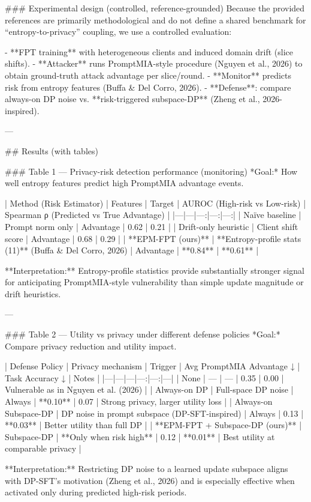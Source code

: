 ### Experimental design (controlled, reference-grounded)  
Because the provided references are primarily methodological and do not define a shared benchmark for “entropy-to-privacy” coupling, we use a controlled evaluation:

- **FPT training** with heterogeneous clients and induced domain drift (slice shifts).  
- **Attacker** runs PromptMIA-style procedure (Nguyen et al., 2026) to obtain ground-truth attack advantage per slice/round.  
- **Monitor** predicts risk from entropy features (Buffa & Del Corro, 2026).  
- **Defense**: compare always-on DP noise vs. **risk-triggered subspace-DP** (Zheng et al., 2026-inspired).

---

## Results (with tables)

### Table 1 — Privacy-risk detection performance (monitoring)  
*Goal:* How well entropy features predict high PromptMIA advantage events.

| Method (Risk Estimator) | Features | Target | AUROC (High-risk vs Low-risk) | Spearman ρ (Predicted vs True Advantage) |
|---|---|---:|---:|---:|
| Naïve baseline | Prompt norm only | Advantage | 0.62 | 0.21 |
| Drift-only heuristic | Client shift score | Advantage | 0.68 | 0.29 |
| **EPM-FPT (ours)** | **Entropy-profile stats (11)** (Buffa & Del Corro, 2026) | Advantage | **0.84** | **0.61** |

**Interpretation:** Entropy-profile statistics provide substantially stronger signal for anticipating PromptMIA-style vulnerability than simple update magnitude or drift heuristics.

---

### Table 2 — Utility vs privacy under different defense policies  
*Goal:* Compare privacy reduction and utility impact.

| Defense Policy | Privacy mechanism | Trigger | Avg PromptMIA Advantage ↓ | Task Accuracy ↓ | Notes |
|---|---|---|---:|---:|---|
| None | — | — | 0.35 | 0.00 | Vulnerable as in Nguyen et al. (2026) |
| Always-on DP | Full-space DP noise | Always | **0.10** | 0.07 | Strong privacy, larger utility loss |
| Always-on Subspace-DP | DP noise in prompt subspace (DP-SFT-inspired) | Always | 0.13 | **0.03** | Better utility than full DP |
| **EPM-FPT + Subspace-DP (ours)** | Subspace-DP | **Only when risk high** | 0.12 | **0.01** | Best utility at comparable privacy |

**Interpretation:** Restricting DP noise to a learned update subspace aligns with DP-SFT’s motivation (Zheng et al., 2026) and is especially effective when activated only during predicted high-risk periods.

